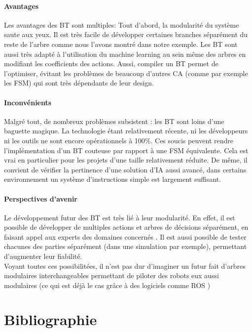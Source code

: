 \documentclass[titlepage]{article}
\begin{document}
	\paragraph{Avantages} Les avantages des BT sont multiples: Tout d'abord, la modularité du système saute aux yeux. \cite{colledanchise_2017} Il est très facile de développer certaines branches séparément du reste de l'arbre comme nous l'avons montré dans notre exemple.
	Les BT sont aussi très adapté à l'utilisation du machine learning au sein même des arbres en modifiant les coefficients des actions. \cite{Fu2016/08}
	Aussi, compiler un BT permet de l'optimiser, évitant les problèmes de beaucoup d'autres CA (comme par exemple les FSM) qui sont très dépendants de leur design. \cite{colledanchise_2017}
	\paragraph{Inconvénients} Malgré tout, de nombreux problèmes subsistent : les BT sont loins d'une baguette magique. La technologie étant relativement récente, ni les développeurs ni les outils ne sont encore opérationnels à 100\%. Ces soucis peuvent rendre l'implémentation d'un BT couteuse par rapport à une FSM équivalente. \cite{colledanchise_2017} Cela est vrai en particulier pour les projets d'une taille relativement réduite. 
	De même, il convient de vérifier la pertinence d'une solution d'IA aussi avancé, dans certains environnement un système d'instructions simple est largement suffisant.
	\paragraph{Perspectives d'avenir} Le développement futur des BT est très lié à leur modularité. En effet, il est possible de développer de multiples actions et arbres de décisions séparément, en faisant appel aux experts des domaines concernés \cite{colledanchise_2017}. Il est aussi possible de tester chacunes des parties séparément (dans une simulation par exemple), permettant d'augmenter leur fiabilité. 
	\\
	Voyant toutes ces possibilitées, il n'est pas dur d'imaginer un futur fait d'arbres modulaires interchangeables permettant de piloter des robots eux aussi modulaires (ce qui est déjà le cas grâce à des logiciels comme ROS \cite{ros.org})
	\clearpage
	\section{Bibliographie}
	
	
\end{document}
